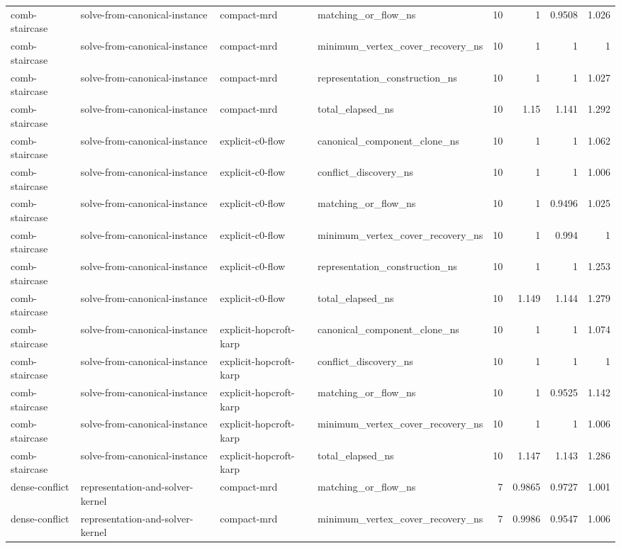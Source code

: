 \begin{table}[t]
\begin{tabular}{llllrrrr}
comb-staircase & solve-from-canonical-instance & compact-mrd & matching\_or\_flow\_ns & 10 & 1 & 0.9508 & 1.026 \\
comb-staircase & solve-from-canonical-instance & compact-mrd & minimum\_vertex\_cover\_recovery\_ns & 10 & 1 & 1 & 1 \\
comb-staircase & solve-from-canonical-instance & compact-mrd & representation\_construction\_ns & 10 & 1 & 1 & 1.027 \\
comb-staircase & solve-from-canonical-instance & compact-mrd & total\_elapsed\_ns & 10 & 1.15 & 1.141 & 1.292 \\
comb-staircase & solve-from-canonical-instance & explicit-c0-flow & canonical\_component\_clone\_ns & 10 & 1 & 1 & 1.062 \\
comb-staircase & solve-from-canonical-instance & explicit-c0-flow & conflict\_discovery\_ns & 10 & 1 & 1 & 1.006 \\
comb-staircase & solve-from-canonical-instance & explicit-c0-flow & matching\_or\_flow\_ns & 10 & 1 & 0.9496 & 1.025 \\
comb-staircase & solve-from-canonical-instance & explicit-c0-flow & minimum\_vertex\_cover\_recovery\_ns & 10 & 1 & 0.994 & 1 \\
comb-staircase & solve-from-canonical-instance & explicit-c0-flow & representation\_construction\_ns & 10 & 1 & 1 & 1.253 \\
comb-staircase & solve-from-canonical-instance & explicit-c0-flow & total\_elapsed\_ns & 10 & 1.149 & 1.144 & 1.279 \\
comb-staircase & solve-from-canonical-instance & explicit-hopcroft-karp & canonical\_component\_clone\_ns & 10 & 1 & 1 & 1.074 \\
comb-staircase & solve-from-canonical-instance & explicit-hopcroft-karp & conflict\_discovery\_ns & 10 & 1 & 1 & 1 \\
comb-staircase & solve-from-canonical-instance & explicit-hopcroft-karp & matching\_or\_flow\_ns & 10 & 1 & 0.9525 & 1.142 \\
comb-staircase & solve-from-canonical-instance & explicit-hopcroft-karp & minimum\_vertex\_cover\_recovery\_ns & 10 & 1 & 1 & 1.006 \\
comb-staircase & solve-from-canonical-instance & explicit-hopcroft-karp & total\_elapsed\_ns & 10 & 1.147 & 1.143 & 1.286 \\
dense-conflict & representation-and-solver-kernel & compact-mrd & matching\_or\_flow\_ns & 7 & 0.9865 & 0.9727 & 1.001 \\
dense-conflict & representation-and-solver-kernel & compact-mrd & minimum\_vertex\_cover\_recovery\_ns & 7 & 0.9986 & 0.9547 & 1.006 \\

\end{tabular}
\end{table}

